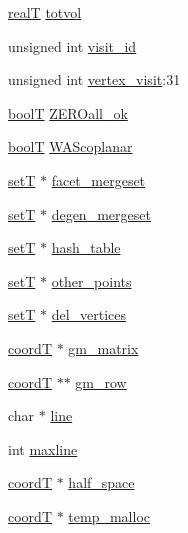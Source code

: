 \begin{DoxyCompactItemize}
\item 
\hyperlink{user_8h_ad6fe71dff955732ea8682263e9540bb7}{real\+T} \hyperlink{structqhT_a72cca8aa17cd9b5f5511d468e36515af}{totvol}
\item 
unsigned int \hyperlink{structqhT_a0e6f0657da199f57a08a7e7aa2c27406}{visit\+\_\+id}
\item 
unsigned int \hyperlink{structqhT_ad5a0684f5f14144cf2a9da7d2d818a6b}{vertex\+\_\+visit}\+:31
\item 
\hyperlink{libqhull_8h_ab1a924b550e00cabe8c367e76b207ea5}{bool\+T} \hyperlink{structqhT_ad69d4a14277fc35527be3f50ccecbe6f}{Z\+E\+R\+Oall\+\_\+ok}
\item 
\hyperlink{libqhull_8h_ab1a924b550e00cabe8c367e76b207ea5}{bool\+T} \hyperlink{structqhT_a1936218be5e356bd1d138de603bd33bf}{W\+A\+Scoplanar}
\item 
\hyperlink{structsetT}{set\+T} $\ast$ \hyperlink{structqhT_ab32ade431425cc74a2af5175125be8c5}{facet\+\_\+mergeset}
\item 
\hyperlink{structsetT}{set\+T} $\ast$ \hyperlink{structqhT_ae584da2556e5e1ad8f9dacf8495ed5dd}{degen\+\_\+mergeset}
\item 
\hyperlink{structsetT}{set\+T} $\ast$ \hyperlink{structqhT_a68059a729e54a518b9eca05bbc046b45}{hash\+\_\+table}
\item 
\hyperlink{structsetT}{set\+T} $\ast$ \hyperlink{structqhT_aee280bd3c65c6b379a774efe6e65eb95}{other\+\_\+points}
\item 
\hyperlink{structsetT}{set\+T} $\ast$ \hyperlink{structqhT_ab15804d70badd73594cdfed1cc51eedb}{del\+\_\+vertices}
\item 
\hyperlink{libqhull_8h_ada1b5d65f4fb1648eef2fa3684de1766}{coord\+T} $\ast$ \hyperlink{structqhT_aa1106a90c3bec5f8ddd55f309b034ba2}{gm\+\_\+matrix}
\item 
\hyperlink{libqhull_8h_ada1b5d65f4fb1648eef2fa3684de1766}{coord\+T} $\ast$$\ast$ \hyperlink{structqhT_a01ceb685e1ca1b9cbe3b0b6b2f63e60a}{gm\+\_\+row}
\item 
char $\ast$ \hyperlink{structqhT_a58533460dc18e0d33d4291cd3c344830}{line}
\item 
int \hyperlink{structqhT_a44b69b942f3bc749b2f749526e0fb533}{maxline}
\item 
\hyperlink{libqhull_8h_ada1b5d65f4fb1648eef2fa3684de1766}{coord\+T} $\ast$ \hyperlink{structqhT_a20137b93ee583f326be62bdc75bd67af}{half\+\_\+space}
\item 
\hyperlink{libqhull_8h_ada1b5d65f4fb1648eef2fa3684de1766}{coord\+T} $\ast$ \hyperlink{structqhT_a3694449dad2943d638f2aa5fbddd36da}{temp\+\_\+malloc}
$$
\end{DoxyCompactItemize}
